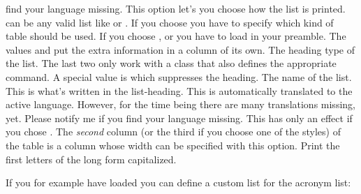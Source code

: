 \documentclass[load-preamble+]{cnltx-doc}
\begin{document}
\begin{options}
    find your language missing.
    This option let's you choose how the list is printed.   can be
    any valid list like  or .
    If you choose  you have to specify which kind of
    table should be used.  If you choose ,
     or  you have to load
     in your preamble.  The values  and
     put the extra information in a column of its
    own.
  \null
    The heading type of the list. The last two only work
    with a \KOMAScript{} class that also defines the appropriate command.  A
    special value is  which suppresses the heading.
    The name of the list.  This is what's written in the list-heading.  This
    is automatically translated to the active language.  However, for the time
    being there are many translations missing, yet.  Please notify me if you
    find your language missing.
    This has only an effect if you chose .  The
    \emph{second} column (or the third if you choose one of the 
    styles) of the table is a  column whose width can be specified
    with this option.
    Print the first letters of the long form capitalized.
 \end{options}
  
If you for example have loaded  you can define a custom list for
the acronym list:
\begin{sourcecode}
  \newcommand*\addcolon[1]{#1:}
  \printacronyms
\end{sourcecode}
\newcommand*\addcolon[1]{#1:}
\printacronyms
\end{document}
